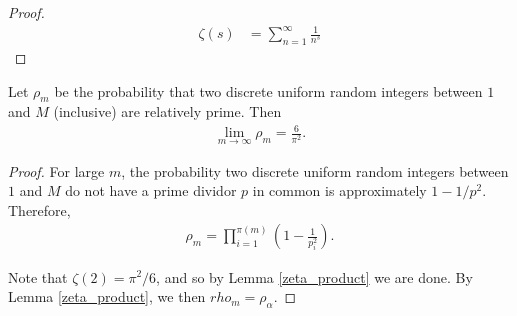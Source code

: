 \begin{proof}
    \begin{align*}
        \zeta(s) &= \sum_{n=1}^{\infty}\frac{1}{n^s}
    \end{align*}
\end{proof}

\begin{thm}\label{zeta-2}
    Let $\rho_m$ be the probability that two discrete uniform random integers between $1$ and $M$ (inclusive) are relatively prime. Then
    \begin{align*}
        \lim_{m\to\infty}\rho_{m} = \frac{6}{\pi^2}.
    \end{align*}
\end{thm}

\begin{proof}
    For large $m$, the probability two discrete uniform random integers between $1$ and $M$ do not have a prime dividor $p$ in common is approximately $1 - 1/p^2$. Therefore,
    \begin{align*}
        \rho_m = \prod_{i=1}^{\pi(m)}\left(1 - \frac{1}{p_i^2}\right).
    \end{align*}

    Note that $\zeta(2) = \pi^2/6$, and so by Lemma \ref{zeta_product} we are done. By Lemma \ref{zeta_product}, we then $rho_m  = \rho_\alpha$.
\end{proof}

